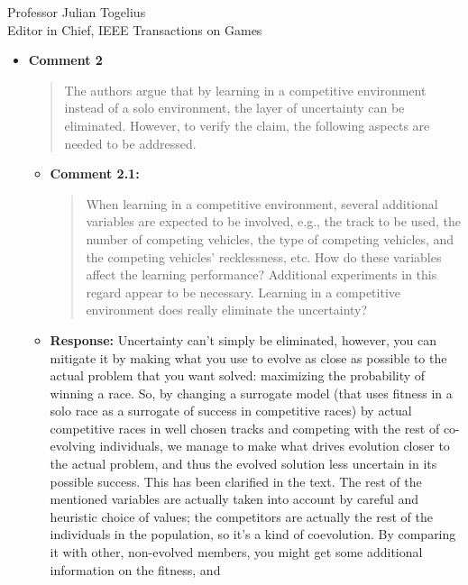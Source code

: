 \documentclass[10pt]{letter} %
\begin{document}
\begin{letter}{Professor Julian Togelius \\ Editor in Chief, IEEE Transactions on Games}
\begin{enumerate}
\begin{itemize}
\item {\bf Comment 2}	
		\begin{quote}
	The authors argue that by learning in a competitive environment instead of a solo environment, the layer of uncertainty can be eliminated. However, to verify the claim, the following aspects are needed to be addressed.
		\end{quote}	
	\begin{itemize}	
		\item {\bf Comment 2.1:}				
		\begin{quote}
When learning in a competitive environment, several additional variables are expected to be involved, e.g., the track to be used, the number of competing vehicles, the type of competing vehicles, and the competing vehicles' recklessness, etc. How do these variables affect the learning performance? Additional experiments in this regard appear to be necessary. Learning in a competitive environment does really eliminate the uncertainty?
			\end{quote}	
			\item {\bf Response:}
			Uncertainty can't simply be eliminated,
                        however, you can mitigate it by making what
                        you use to evolve as close as possible to the
                        actual problem that you want solved:
                        maximizing the probability of winning a
                        race. So, by changing a surrogate model (that
                        uses fitness in a solo race as a surrogate of
                        success in competitive races) by actual
                        competitive races in well chosen tracks and
                        competing with the rest of co-evolving
                        individuals, we manage to make what drives
                        evolution closer to the actual problem, and
                        thus the evolved solution less uncertain in
                        its possible success. This has been clarified
                        in the text. The rest of the mentioned
                        variables are actually taken into account by
                        careful and heuristic choice of values; the
                        competitors are actually the rest of the
                        individuals in the population, so it's a kind
                        of coevolution. By comparing it with other,
                        non-evolved members, you might get some
                        additional information on the fitness, and

\end{itemize}
\end{itemize}
\end{enumerate}
\end{letter}
\end{document}
